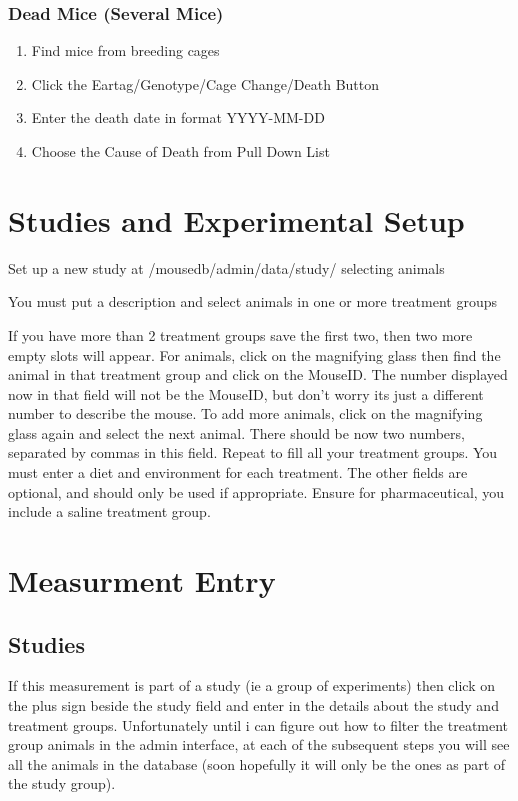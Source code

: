 \documentclass[letterpaper,10pt,english]{sphinxmanual}
\begin{document}
\subsection{Dead Mice (Several Mice)}
\label{usage:dead-mice-several-mice}\begin{enumerate}
\item {} 
Find mice from breeding cages

\item {} 
Click the Eartag/Genotype/Cage Change/Death Button

\item {} 
Enter the death date in format YYYY-MM-DD

\item {} 
Choose the Cause of Death from Pull Down List

\end{enumerate}


\chapter{Studies and Experimental Setup}
\label{usage:studies-and-experimental-setup}
Set up a new study at /mousedb/admin/data/study/ selecting animals

You must put a description and select animals in one or more treatment groups

If you have more than 2 treatment groups save the first two, then two more empty slots will appear. For animals, click on the magnifying glass then find the animal in that treatment group and click on the MouseID. The number displayed now in that field will not be the MouseID, but don't worry its just a different number to describe the mouse. To add more animals, click on the magnifying glass again and select the next animal. There should be now two numbers, separated by commas in this field. Repeat to fill all your treatment groups. You must enter a diet and environment for each treatment. The other fields are optional, and should only be used if appropriate. Ensure for pharmaceutical, you include a saline treatment group.


\chapter{Measurment Entry}
\label{usage:measurment-entry}

\section{Studies}
\label{usage:studies}
If this measurement is part of a study (ie a group of experiments) then click on the plus sign beside the study field and enter in the details about the study and treatment groups.  Unfortunately until i can figure out how to filter the treatment group animals in the admin interface, at each of the subsequent steps you will see all the animals in the database (soon hopefully it will only be the ones as part of the study group).
\end{document}

